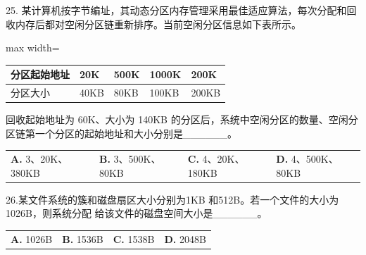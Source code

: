 \documentclass[UTF8,11pt]{ctexart}
\begin{document}
25. 某计算机按字节编址，其动态分区内存管理采用最佳适应算法，每次分配和回收内存后都对空闲分区链重新排序。当前空闲分区信息如下表所示。


\begin{center}\begin{adjustbox}{max width=\linewidth}\begin{tabular}{|>{\raggedright\arraybackslash}p{\dimexpr(\linewidth-10\tabcolsep-6\arrayrulewidth)/5\relax}|>{\raggedright\arraybackslash}p{\dimexpr(\linewidth-10\tabcolsep-6\arrayrulewidth)/5\relax}|>{\raggedright\arraybackslash}p{\dimexpr(\linewidth-10\tabcolsep-6\arrayrulewidth)/5\relax}|>{\raggedright\arraybackslash}p{\dimexpr(\linewidth-10\tabcolsep-6\arrayrulewidth)/5\relax}|>{\raggedright\arraybackslash}p{\dimexpr(\linewidth-10\tabcolsep-6\arrayrulewidth)/5\relax}|}\hline
分区起始地址 & 20K & 500K & 1000K & 200K\\\hline
分区大小 & 40KB & 80KB & 100KB & 200KB\\\hline\end{tabular}\end{adjustbox}\end{center}

回收起始地址为 60K、大小为 140KB 的分区后，系统中空闲分区的数量、空闲分区链第一个分区的起始地址和大小分别是\_\_\_\_\_\_。


\begin{center}\begin{tabular}{>{\raggedright\arraybackslash}p{\dimexpr(\linewidth-8\tabcolsep)/4\relax}>{\raggedright\arraybackslash}p{\dimexpr(\linewidth-8\tabcolsep)/4\relax}>{\raggedright\arraybackslash}p{\dimexpr(\linewidth-8\tabcolsep)/4\relax}>{\raggedright\arraybackslash}p{\dimexpr(\linewidth-8\tabcolsep)/4\relax}}
\textbf{A.} 3、20K、380KB & \textbf{B.} 3、500K、80KB & \textbf{C.} 4、20K、180KB & \textbf{D.} 4、500K、80KB\\[.35em]\end{tabular}\end{center}

26.某文件系统的簇和磁盘扇区大小分别为1KB 和512B。若一个文件的大小为1026B，则系统分配 给该文件的磁盘空间大小是\_\_\_\_\_\_。


\begin{center}\begin{tabular}{>{\raggedright\arraybackslash}p{\dimexpr(\linewidth-8\tabcolsep)/4\relax}>{\raggedright\arraybackslash}p{\dimexpr(\linewidth-8\tabcolsep)/4\relax}>{\raggedright\arraybackslash}p{\dimexpr(\linewidth-8\tabcolsep)/4\relax}>{\raggedright\arraybackslash}p{\dimexpr(\linewidth-8\tabcolsep)/4\relax}}
\textbf{A.} 1026B & \textbf{B.} 1536B & \textbf{C.} 1538B & \textbf{D.} 2048B\\[.35em]\end{tabular}\end{center}
\end{document}
